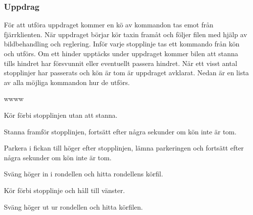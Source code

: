 \documentclass[tekniskrapport/tech.tex]{subfiles}
\begin{document}
\subsubsection{Uppdrag} \label{sec:comm-mission}
För att utföra uppdraget kommer en kö av kommandon tas emot från fjärrklienten.
När uppdraget börjar kör taxin framåt och följer filen med hjälp av
bildbehandling och reglering. Inför varje stopplinje tas ett kommando från kön
och utförs. Om ett hinder upptäcks under uppdraget kommer bilen att stanna
tills hindret har försvunnit eller eventuellt passera hindret. När ett visst
antal stopplinjer har passerats och kön är tom är uppdraget avklarat. Nedan är
en lista av alla möjliga kommandon hur de utförs.
\begin{labeling}{wwww}
    \item[\commIgnore] Kör förbi stopplinjen utan att stanna.
    \item[\commStop] Stanna framför stopplinjen, fortsätt efter några sekunder
    om kön inte är tom.
    \item[\commPark] Parkera i fickan till höger efter stopplinjen, lämna
    parkeringen och fortsätt efter några sekunder om kön inte är tom.
    \item[\commEnter] Sväng höger in i rondellen och hitta rondellens körfil.
    \item[\commContinue] Kör förbi stopplinje och håll till vänster.
    \item[\commExit] Sväng höger ut ur rondellen och hitta körfilen.
\end{labeling}
\end{document}
